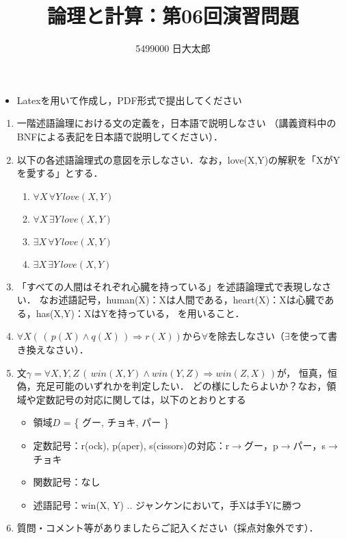 \documentclass[dvipdfmx]{jsarticle}
\def\NO{06}
\def\LECTURENAME{論理と計算}
\begin{document}
\title{\LECTURENAME{}：第\NO{}回演習問題}

\author{5499000 日大太郎}

\date{}
\maketitle

\begin{itemize}
\item Latexを用いて作成し，PDF形式で提出してください
\end{itemize}


\vspace*{\baselineskip}

\begin{enumerate}\setlength{\itemsep}{\baselineskip}
\item  一階述語論理における文の定義を，日本語で説明しなさい
（講義資料中のBNFによる表記を日本語で説明してください）．

\item 以下の各述語論理式の意図を示しなさい．なお，love(X,Y)の解釈を「XがYを愛する」とする．
  \begin{enumerate}
  \item $\forall X\,\forall Y\, love(X,Y)$
  \item $\forall X\,\exists Y\, love(X,Y)$
  \item $\exists X\,\forall Y\, love(X,Y)$
  \item $\exists X\,\exists Y\, love(X,Y)$
  \end{enumerate}

\item 「すべての人間はそれぞれ心臓を持っている」を述語論理式で表現しなさい．
  なお述語記号，human(X)：Xは人間である，heart(X)：Xは心臓である，has(X,Y)：XはYを持っている，
  を用いること．

\item $\forall X (\, (\, p(X)\land q(X)\,) \Rightarrow r(X) )$から$\forall$を除去しなさい（$\exists$を使って書き換えなさい）．


\item 文$\gamma = \forall X, Y, Z\, (\, win(X,Y) \land win(Y,Z)\Rightarrow  win(Z,X) \,)$が，
  恒真，恒偽，充足可能のいずれかを判定したい．
  どの様にしたらよいか？なお，領域や定数記号の対応に関しては，以下のとおりとする

  \begin{itemize}
  \item 領域$D$ = \{ グー, チョキ, パー \}
  \item 定数記号：r(ock), p(aper), s(cissors)の対応：r$\rightarrow$グー，p$\rightarrow$パー，s$\rightarrow$チョキ
  \item 関数記号：なし
  \item 述語記号：win(X, Y) .. ジャンケンにおいて，手Xは手Yに勝つ
  \end{itemize}

\item 質問・コメント等がありましたらご記入ください（採点対象外です）．  

\end{enumerate}
\end{document}
